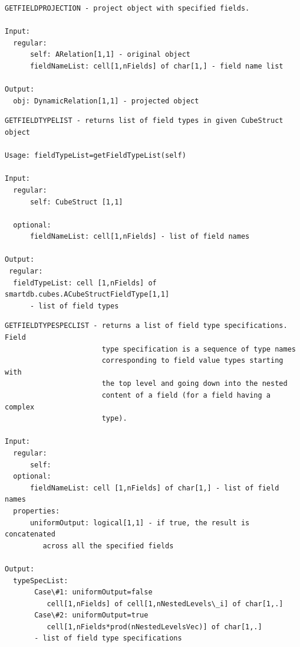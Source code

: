 \documentclass[letterpaper,10pt,english]{sphinxmanual}
\begin{document}
\label{chap_func:smartdb-relations-atypifiedstaticrelation-getfieldprojection}
\begin{Verbatim}[commandchars=\\\{\}]
GETFIELDPROJECTION - project object with specified fields.

Input:
  regular:
      self: ARelation[1,1] - original object
      fieldNameList: cell[1,nFields] of char[1,] - field name list

Output:
  obj: DynamicRelation[1,1] - projected object
\end{Verbatim}
\label{chap_func:smartdb-relations-atypifiedstaticrelation-getfieldtypelist}
\begin{Verbatim}[commandchars=\\\{\}]
GETFIELDTYPELIST - returns list of field types in given CubeStruct object

Usage: fieldTypeList=getFieldTypeList(self)

Input:
  regular:
      self: CubeStruct [1,1]

  optional:
      fieldNameList: cell[1,nFields] - list of field names

Output:
 regular:
  fieldTypeList: cell [1,nFields] of smartdb.cubes.ACubeStructFieldType[1,1]
      - list of field types
\end{Verbatim}
\label{chap_func:smartdb-relations-atypifiedstaticrelation-getfieldtypespeclist}
\begin{Verbatim}[commandchars=\\\{\}]
GETFIELDTYPESPECLIST - returns a list of field type specifications. Field
                       type specification is a sequence of type names
                       corresponding to field value types starting with
                       the top level and going down into the nested
                       content of a field (for a field having a complex
                       type).

Input:
  regular:
      self:
  optional:
      fieldNameList: cell [1,nFields] of char[1,] - list of field names
  properties:
      uniformOutput: logical[1,1] - if true, the result is concatenated
         across all the specified fields

Output:
  typeSpecList:
       Case\#1: uniformOutput=false
          cell[1,nFields] of cell[1,nNestedLevels\_i] of char[1,.]
       Case\#2: uniformOutput=true
          cell[1,nFields*prod(nNestedLevelsVec)] of char[1,.]
       - list of field type specifications
\end{Verbatim}
\end{document}
